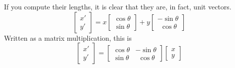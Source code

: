 \documentclass[11pt, oneside]{article}   	%
\begin{document}
If you compute their lengths, it is clear that they are, in fact, unit vectors.
\[
\begin{bmatrix}  x' \\ y' \end{bmatrix}
=
x
\begin{bmatrix}  \cos \theta \\ \sin \theta \end{bmatrix}
+
y
\begin{bmatrix}  -\sin \theta \\ \ \ \cos \theta \end{bmatrix}
\]
Written as a matrix multiplication, this is
\[
\begin{bmatrix}  x' \\ y' \end{bmatrix}
=
\begin{bmatrix}  
\cos \theta & -\sin \theta \\
\sin \theta & \ \  \cos \theta 
\end{bmatrix}
\begin{bmatrix}  x \\ y \end{bmatrix}
\]
\end{document}
